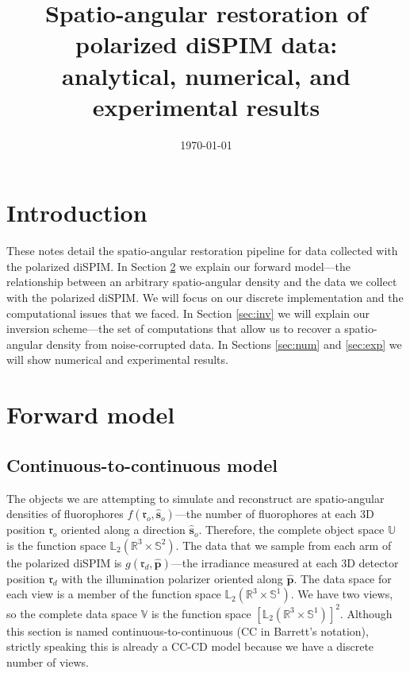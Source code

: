 \documentclass[11pt]{article}
\providecommand{\ro}{\mathbf{\mathfrak{r}}_o}
\providecommand{\so}{\mathbf{\hat{s}}_o}
\providecommand{\rd}{\mathbf{\mathfrak{r}}_d}
\providecommand{\mh}[1]{\mathbf{\hat{#1}}}
\providecommand{\mbb}[1]{\mathbb{#1}}
\providecommand{\p}{\mh{p}}
\begin{document}
\title{\vspace{-2.5em} Spatio-angular restoration of polarized diSPIM data:\\
  analytical, numerical, and experimental results
  \vspace{-1em}} %
\date{\vspace{-3em}\today\vspace{-1em}}
\maketitle
\section{Introduction}
These notes detail the spatio-angular restoration pipeline for data collected
with the polarized diSPIM. In Section \ref{sec:fwd} we explain our forward
model---the relationship between an arbitrary spatio-angular density and the
data we collect with the polarized diSPIM. We will focus on our discrete
implementation and the computational issues that we faced. In Section
\ref{sec:inv} we will explain our inversion scheme---the set of computations
that allow us to recover a spatio-angular density from noise-corrupted data. In
Sections \ref{sec:num} and \ref{sec:exp} we will show numerical and experimental
results.

\section{Forward model} \label{sec:fwd}
\subsection{Continuous-to-continuous model} \label{sec:cc}
The objects we are attempting to simulate and reconstruct are spatio-angular
densities of fluorophores $f(\ro, \so)$---the number of fluorophores at each 3D
position $\ro$ oriented along a direction $\so$. Therefore, the complete object
space $\mbb{U}$ is the function space $\mbb{L}_2(\mbb{R}^3 \times \mbb{S}^2)$.
The data that we sample from each arm of the polarized diSPIM is
$g(\rd, \p)$---the irradiance measured at each 3D detector position $\rd$ with
the illumination polarizer oriented along $\p$. The data space for each view is
a member of the function space $\mbb{L}_2(\mbb{R}^3 \times \mbb{S}^1)$. We have
two views, so the complete data space $\mbb{V}$ is the function space
$[\mbb{L}_2(\mbb{R}^3 \times \mbb{S}^1)]^2$. Although this section is named
continuous-to-continuous (CC in Barrett's notation), strictly speaking this is
already a CC-CD model because we have a discrete number of views.
\end{document}
